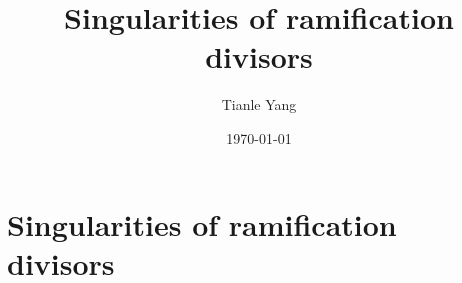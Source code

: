 \documentclass[sectionlevel=section,status=draft]{noteformyself}
\title{Singularities of ramification divisors}
\author{Tianle Yang}
\date{\today}
\begin{document}
\maketitle

    \section[
      status=draft,
      tag=00000,
      label=\labelNFM{sec:endomorphisms-on-projective-spaces:singularities-of-ramification-divisors}
    ]{Singularities of ramification divisors}



\end{document}
